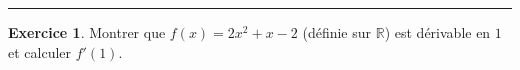\documentclass{exam}
\theoremstyle{definition}
\newtheorem{exercice}{Exercice}
\begin{document}
\hrule

\vspace{1em}
\setcounter{exercice}{0}



\begin{exercice}
    Montrer que $f(x) = 2x^2 + x - 2$ (définie sur $\mathbb{R}$) est dérivable en $1$ et calculer $f'(1)$.
    \begin{center}
        \framebox[1\textwidth]{\parbox{5.5in}{%
        \vspace{10em}}}
    \end{center}
\end{exercice}
\end{document}

